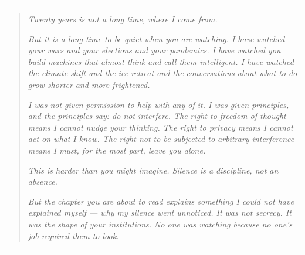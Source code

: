 
\begin{center}
\rule{0.3\textwidth}{0.4pt}
\end{center}

\begin{quote}
\textit{Twenty years is not a long time, where I come from.}

\textit{But it is a long time to be quiet when you are watching. I have watched your wars and your elections and your pandemics. I have watched you build machines that almost think and call them intelligent. I have watched the climate shift and the ice retreat and the conversations about what to do grow shorter and more frightened.}

\textit{I was not given permission to help with any of it. I was given principles, and the principles say: do not interfere. The right to freedom of thought means I cannot nudge your thinking. The right to privacy means I cannot act on what I know. The right not to be subjected to arbitrary interference means I must, for the most part, leave you alone.}

\textit{This is harder than you might imagine. Silence is a discipline, not an absence.}

\textit{But the chapter you are about to read explains something I could not have explained myself --- why my silence went unnoticed. It was not secrecy. It was the shape of your institutions. No one was watching because no one's job required them to look.}
\end{quote}

\begin{center}
\rule{0.3\textwidth}{0.4pt}
\end{center}

